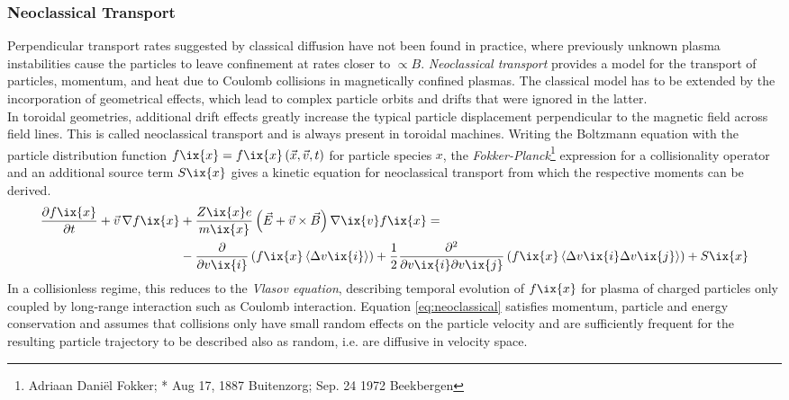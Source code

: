             \subsubsection*{Neoclassical Transport}%
%
                Perpendicular transport rates suggested by classical diffusion have not been found in practice, where previously unknown plasma instabilities cause the particles to leave confinement at rates closer to $\propto B$. \textit{Neoclassical transport} provides a model for the transport of particles, momentum, and heat due to Coulomb collisions in magnetically confined plasmas. The classical model has to be extended by the incorporation of geometrical effects, which lead to complex particle orbits and drifts that were ignored in the latter.\\
                In toroidal geometries, additional drift effects greatly increase the typical particle displacement perpendicular to the magnetic field across field lines. This is called neoclassical transport and is always present in toroidal machines. Writing the Boltzmann equation with the particle distribution function $f\ix{x}=f\ix{x}\left(\vec{x},\vec{v},t\right)$ for particle species $x$, the \textit{Fokker-Planck}\footnote[1]{Adriaan Daniël Fokker; * Aug 17, 1887 Buitenzorg; \textdagger Sep. 24 1972 Beekbergen} expression for a collisionality operator and an additional source term $S\ix{x}$ gives a kinetic equation for neoclassical transport from which the respective moments can be derived\cite{WikiFokkerPlanck}.%
%
                \begin{align}%
                    \frac{\partial f\ix{x}}{\partial t}+\vec{v}\,\nabla f\ix{x}&+\frac{Z\ix{x}e}{m\ix{x}}\left(\vec{E}+\vec{v}\times\vec{B}\right)\nabla\ix{v}f\ix{x}=\nonumber\\%
                    &-\frac{\partial}{\partial v\ix{i}}\left(f\ix{x}\left\langle\Delta v\ix{i}\right\rangle\right)+\frac{1}{2}\frac{\partial^{2}}{\partial v\ix{i}\partial v\ix{j}}\left(f\ix{x}\left\langle\Delta v\ix{i}\Delta v\ix{j}\right\rangle\right)+S\ix{x}\label{eq:neoclassical}%
                \end{align}%
%
                In a collisionless regime, this reduces to the \textit{Vlasov equation}, describing temporal evolution of $f\ix{x}$ for plasma of charged particles only coupled by long-range interaction such as Coulomb interaction\cite{WikiVlasov}. Equation \ref{eq:neoclassical} satisfies momentum, particle and energy conservation and assumes that collisions only have small random effects on the particle velocity and are sufficiently frequent for the resulting particle trajectory to be described also as random, i.e. are diffusive in velocity space.\\%

